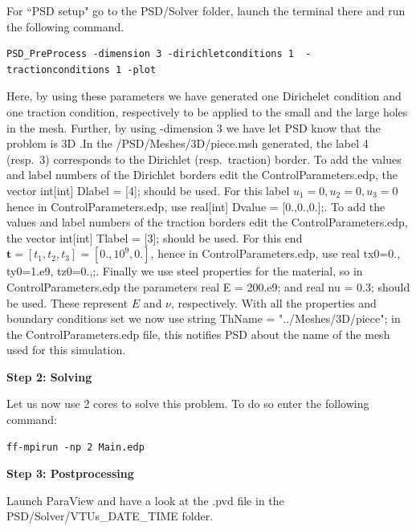 \documentclass{report}
\begin{document}
For ``PSD setup" go to the {\ttfamily PSD/Solver} folder, launch the terminal there and run the following command.
\begin{lstlisting}[style=Linux]
PSD_PreProcess -dimension 3 -dirichletconditions 1  -tractionconditions 1 -plot
\end{lstlisting}
Here, by using these parameters we have generated one Dirichelet condition and one traction condition, respectively to be applied to the small and the large holes in the mesh. Further, by using {\ttfamily -dimension 3} we have let PSD know that the problem is 3D .In the {\ttfamily /PSD/Meshes/3D/piece.msh} generated, the label 4 (resp.~3) corresponds to the Dirichlet (resp.~traction) border. To add the values and label numbers of the Dirichlet borders edit the  {\ttfamily ControlParameters.edp},  the vector {\ttfamily int[int] Dlabel = [4];} should be used. For this label $u_1=0,u_2=0,u_3=0$ hence in {\ttfamily ControlParameters.edp}, use {\ttfamily real[int]   Dvalue = [0.,0.,0.];}. To add the values and label numbers of the traction borders edit the  {\ttfamily ControlParameters.edp},  the vector {\ttfamily int[int] Tlabel = [3];} should be used. For this end $\mathbf t=[t_1,t_2,t_3]=[0.,10^9,0.]$, hence in {\ttfamily ControlParameters.edp}, use {\ttfamily real  tx0=0., ty0=1.e9, tz0=0.,;}. Finally we use steel properties for the material, so in {\ttfamily ControlParameters.edp} the parameters {\ttfamily real E  = 200.e9;} and {\ttfamily real nu = 0.3;} should be used. These represent $E$ and $\nu$, respectively. With all the properties and boundary conditions set we now use  {\ttfamily string ThName = "../Meshes/3D/piece";} in the {\ttfamily ControlParameters.edp} file, this notifies PSD about the name of the mesh used for this simulation.  

\textbf{Step 2: Solving}

Let us now use 2 cores to solve this problem. To do so enter the following command:

\begin{lstlisting}[style=Linux]
ff-mpirun -np 2 Main.edp
\end{lstlisting}

\textbf{Step 3: Postprocessing}

Launch ParaView and have a look at the  {\ttfamily .pvd} file in the  {\ttfamily PSD/Solver/VTUs\_DATE\_TIME} folder. 
\end{document}
